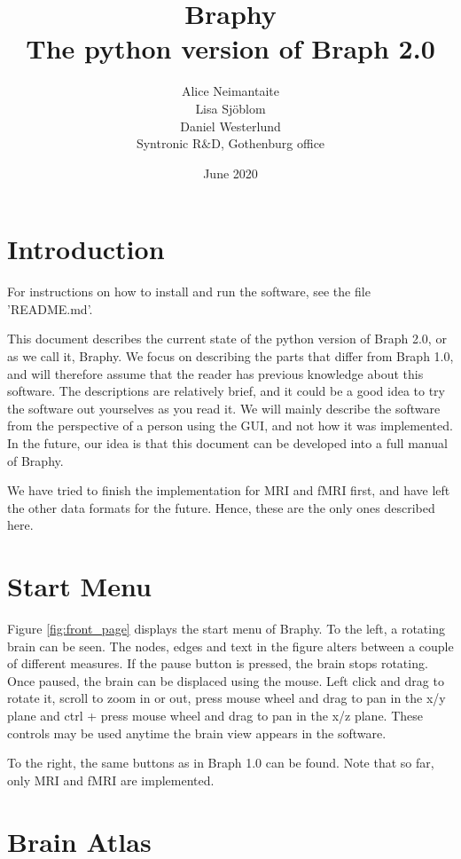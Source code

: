\documentclass{article}
\title{%
	Braphy \\
	\large The python version of Braph 2.0}
\author{Alice Neimantaite \\ Lisa Sjöblom \\ Daniel Westerlund\\Syntronic R$\&$D, Gothenburg office}
\date{June 2020}
\begin{document}
\maketitle
\thispagestyle{fancy}
\clearpage

\section{Introduction}

For instructions on how to install and run the software, see the file 'README.md'.

This document describes the current state of the python version of Braph 2.0, or as we call it, Braphy. We focus on describing the parts that differ from Braph 1.0, and will therefore assume that the reader has previous knowledge about this software. The descriptions are relatively brief, and it could be a good idea to try the software out yourselves as you read it. We will mainly describe the software from the perspective of a person using the GUI, and not how it was implemented. In the future, our idea is that this document can be developed into a full manual of Braphy.

We have tried to finish the implementation for MRI and fMRI first, and have left the other data formats for the future. Hence, these are the only ones described here.

\section{Start Menu}

Figure \ref{fig:front_page} displays the start menu of Braphy. To the left, a rotating brain can be seen. The nodes, edges and text in the figure alters between a couple of different measures. If the pause button is pressed, the brain stops rotating. Once paused, the brain can be displaced using the mouse. Left click and drag to rotate it, scroll to zoom in or out, press mouse wheel and drag to pan in the x/y plane and ctrl + press mouse wheel and drag to pan in the x/z plane. These controls may be used anytime the brain view appears in the software.

To the right, the same buttons as in Braph 1.0 can be found. Note that so far, only MRI and fMRI are implemented. 

\section{Brain Atlas}
\end{document}
